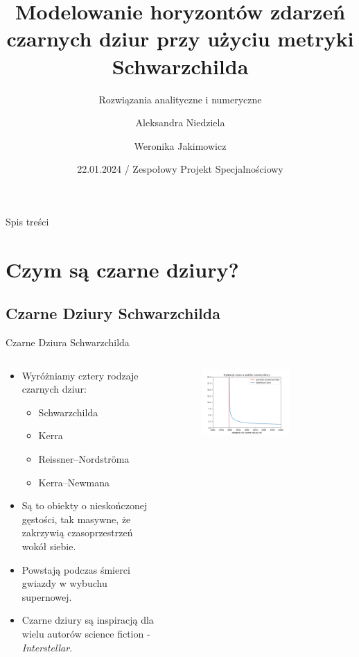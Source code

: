 \documentclass[polish, 9pt, xcolor=table, hyperref={pdfpagemode=FullScreen}]{beamer}
\title[Czarne Dziury Schwarzchilda] %
{Modelowanie horyzontów zdarzeń czarnych dziur przy użyciu metryki Schwarzchilda}
\subtitle
{Rozwiązania analityczne i numeryczne } %
\author[Aleksandra Niedziela, Weronika Jakimowicz] %
{Aleksandra Niedziela \and Weronika Jakimowicz}
\institute[Uniwersytet Wrocławski] %
{
  Wydział Matematyki i Informatyki\\
  Uniwersytet Wrocławski
 }
\date[Short Occasion] %
{22.01.2024 / Zespołowy Projekt Specjalnościowy}
\begin{document}
\begin{frame}
  \titlepage
\end{frame}

\begin{frame}{Spis treści}
  \tableofcontents
\end{frame}

\section{Czym są czarne dziury?}

\subsection[Czarne Dziura Schwarzchilda]{Czarne Dziury Schwarzchilda}

\begin{frame}{Czarne Dziura Schwarzchilda}
\begin{columns}
\begin{column}{0.5\textwidth}
\begin{itemize}
\item
	Wyróżniamy cztery rodzaje czarnych dziur: 
\begin{itemize}
\item
	Schwarzchilda
\item 
	Kerra 
\item
	Reissner–Nordströma
\item 
	Kerra–Newmana
\end{itemize}
\item 
	Są to obiekty o nieskończonej gęstości, tak masywne, że zakrzywią czasoprzestrzeń wokół siebie.
\item 
	Powstają podczas śmierci gwiazdy w wybuchu supernowej. 
\item
	Czarne dziury są inspiracją dla wielu autorów science fiction - \textit{Interstellar}.
\end{itemize}
\end{column}
	
\begin{column}{0.5\textwidth}
\begin{figure}
\centering
 \includegraphics[width=0.7\textwidth]{ilustracje/Time_near_black_hole.png}
\end{figure}


\end{column}
\end{columns}
\end{frame}
\end{document}
